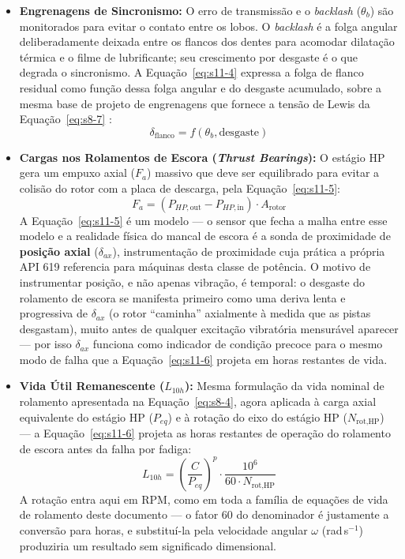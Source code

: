 \documentclass[12pt,a4paper]{article}
\numberwithin{equation}{section}
\numberwithin{table}{section}
\numberwithin{figure}{section}
\begin{document}
{	\begin{itemize}
		\item \textbf{Engrenagens de Sincronismo:}
		O erro de transmissão e o \textit{backlash} ($\theta_b$) são monitorados para evitar o contato entre os lobos. O \textit{backlash} é a folga angular deliberadamente deixada entre os flancos dos dentes para acomodar dilatação térmica e o filme de lubrificante; seu crescimento por desgaste é o que degrada o sincronismo. A Equação~\eqref{eq:s11-4} expressa a folga de flanco residual como função dessa folga angular e do desgaste acumulado, sobre a mesma base de projeto de engrenagens que fornece a tensão de Lewis da Equação~\eqref{eq:s8-7} \cite[Cap.~13 e 14]{shigley}:
		\begin{equation}\label{eq:s11-4}
 \delta_{\text{flanco}} = f(\theta_b, \text{desgaste}) 
\end{equation}
		
		\item \textbf{Cargas nos Rolamentos de Escora (\textit{Thrust Bearings}):}
		O estágio HP gera um empuxo axial ($F_a$) massivo que deve ser equilibrado para evitar a colisão do rotor com a placa de descarga, pela Equação~\eqref{eq:s11-5}:
		\begin{equation}\label{eq:s11-5}
 F_a = (P_{HP,\text{out}} - P_{HP,\text{in}}) \cdot A_{\text{rotor}}
\end{equation}
		A Equação~\eqref{eq:s11-5} é um modelo — o sensor que fecha a malha entre esse modelo e a realidade física do mancal de escora é a sonda de proximidade de \textbf{posição axial} ($\delta_{ax}$), instrumentação de proximidade cuja prática a própria API 619 \cite{api619} referencia para máquinas desta classe de potência. O motivo de instrumentar posição, e não apenas vibração, é temporal: o desgaste do rolamento de escora se manifesta primeiro como uma deriva lenta e progressiva de $\delta_{ax}$ (o rotor ``caminha'' axialmente à medida que as pistas desgastam), muito antes de qualquer excitação vibratória mensurável aparecer — por isso $\delta_{ax}$ funciona como indicador de condição precoce para o mesmo modo de falha que a Equação~\eqref{eq:s11-6} projeta em horas restantes de vida.

		\item \textbf{Vida Útil Remanescente ($L_{10h}$):} Mesma formulação da vida nominal de rolamento apresentada na Equação~\eqref{eq:s8-4}, agora aplicada à carga axial equivalente do estágio HP ($P_{eq}$) e à rotação do eixo do estágio HP ($N_{\text{rot,HP}}$) — a Equação~\eqref{eq:s11-6} projeta as horas restantes de operação do rolamento de escora antes da falha por fadiga:
		\begin{equation}\label{eq:s11-6}
 L_{10h} = \left( \frac{C}{P_{eq}} \right)^p \cdot \frac{10^6}{60 \cdot N_{\text{rot,HP}}}
\end{equation}
		A rotação entra aqui em RPM, como em toda a família de equações de vida de rolamento deste documento — o fator $60$ do denominador é justamente a conversão para horas, e substituí-la pela velocidade angular $\omega$ (rad\,s$^{-1}$) produziria um resultado sem significado dimensional.
	\end{itemize}
	
}
\end{document}
